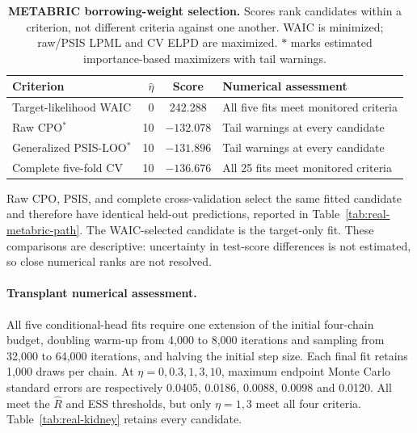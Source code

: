 \documentclass{article} %
\begin{document}
\begin{table}[htbp]
\centering\footnotesize
\caption{\textbf{METABRIC borrowing-weight selection.} Scores rank candidates within a criterion, not different criteria against one another. WAIC is minimized; raw/PSIS LPML and CV ELPD are maximized. $*$ marks estimated importance-based maximizers with tail warnings.}
\label{tab:real-selector-consequences}
\setlength{\tabcolsep}{5pt}
\begin{tabular}{@{}lrcl@{}}
\toprule
Criterion & $\widehat\eta$ & Score & Numerical assessment\\
\midrule
Target-likelihood WAIC & 0 & 242.288 & All five fits meet monitored criteria\\
Raw CPO$^*$ & 10 & $-132.078$ & Tail warnings at every candidate\\
Generalized PSIS-LOO$^*$ & 10 & $-131.896$ & Tail warnings at every candidate\\
Complete five-fold CV & 10 & $-136.676$ & All 25 fits meet monitored criteria\\
\bottomrule
\end{tabular}
\end{table}

Raw CPO, PSIS, and complete cross-validation select the same fitted candidate and therefore have identical held-out predictions, reported in Table~\ref{tab:real-metabric-path}. The WAIC-selected candidate is the target-only fit. These comparisons are descriptive: uncertainty in test-score differences is not estimated, so close numerical ranks are not resolved.

\paragraph{Transplant numerical assessment.}
All five conditional-head fits require one extension of the initial four-chain budget, doubling warm-up from 4,000 to 8,000 iterations and sampling from 32,000 to 64,000 iterations, and halving the initial step size. Each final fit retains 1,000 draws per chain. At $\eta=0,0.3,1,3,10$, maximum endpoint Monte Carlo standard errors are respectively 0.0405, 0.0186, 0.0088, 0.0098 and 0.0120. All meet the $\widehat R$ and ESS thresholds, but only $\eta=1,3$ meet all four criteria. Table~\ref{tab:real-kidney} retains every candidate.
\end{document}
